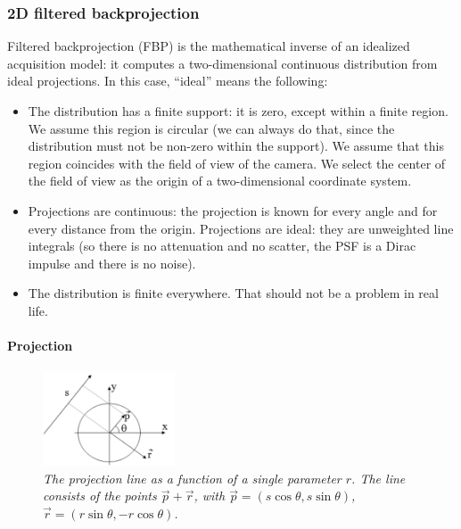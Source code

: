 \documentclass[11pt,oneside]{article}
\begin{document}
\subsubsection{2D filtered backprojection}
Filtered backprojection (FBP) is the mathematical inverse of an idealized
acquisition model: it computes a two-dimensional continuous distribution from
ideal projections. In this case, ``ideal'' means the following:
\begin{itemize}
\item
The distribution has a finite support: it is zero, except within a finite
region.  We assume this region is circular (we can always do that, since the
distribution must not be non-zero within the support). We assume that this
region coincides with the field of view of the camera. We select the center of
the field of view as the origin of a two-dimensional coordinate system.

\item
Projections are continuous: the projection is known for every angle and for
every distance from the origin. Projections are ideal: they are unweighted
line integrals (so there is no attenuation and no scatter, the PSF is a Dirac
impulse and there is no noise).

\item
The distribution is finite everywhere. That should not be a problem in real
life.

\end{itemize}

\paragraph{Projection}
\begin{figure}[tb]
\centering
\includegraphics[width=0.35\textwidth]{figs/fig_fbp_math.pdf}
\caption{\label{fig:fbp_math} \emph{The projection line as a function of a
single parameter $r$. The line consists of the points $\vec{p} + \vec{r}$,
with $\vec{p} = (s \cos \theta, s \sin \theta)$, $\vec{r} = (r \sin \theta, - r
\cos \theta)$.}}
\end{figure}
\end{document}
